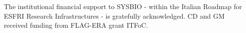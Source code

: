 \documentclass[preprint,12pt,authoryear]{elsarticle}
\begin{document}
The institutional financial support to SYSBIO - within the Italian
Roadmap for ESFRI Research Infrastructures - is gratefully
acknowledged. CD and GM received funding from FLAG-ERA grant ITFoC.





\end{document}
